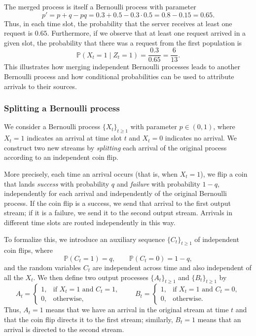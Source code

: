 The merged process is itself a Bernoulli process with parameter
\[
p' = p + q - pq = 0.3 + 0.5 - 0.3 \cdot 0.5 = 0.8 - 0.15 = 0.65.
\]
Thus, in each time slot, the probability that the server receives at least one request is \(0.65\).  
Furthermore, if we observe that at least one request arrived in a given slot, the probability that there was a request from the first population is
\[
\mathbb{P}(X_t = 1 \mid Z_t = 1)
=
\frac{0.3}{0.65}
=
\frac{6}{13}.
\]
This illustrates how merging independent Bernoulli processes leads to another Bernoulli process and how conditional probabilities can be used to attribute arrivals to their sources.


\subsubsection{Splitting a Bernoulli process}

We consider a Bernoulli process \(\{X_t\}_{t \geq 1}\) with parameter \(p \in (0,1)\), where \(X_t = 1\) indicates an arrival at time slot \(t\) and \(X_t = 0\) indicates no arrival.  
We construct two new streams by \textit{splitting} each arrival of the original process according to an independent coin flip.  

More precisely, each time an arrival occurs (that is, when \(X_t = 1\)), we flip a coin that lands \textit{success} with probability \(q\) and \textit{failure} with probability \(1-q\), independently for each arrival and independently of the original Bernoulli process.  
If the coin flip is a success, we send that arrival to the first output stream; if it is a failure, we send it to the second output stream.  
Arrivals in different time slots are routed independently in this way.  

To formalize this, we introduce an auxiliary sequence \(\{C_t\}_{t \geq 1}\) of independent coin flips, where
\[
\mathbb{P}(C_t = 1) = q,
\qquad
\mathbb{P}(C_t = 0) = 1 - q,
\]
and the random variables \(C_t\) are independent across time and also independent of all the \(X_t\).  
We then define two output processes \(\{A_t\}_{t \geq 1}\) and \(\{B_t\}_{t \geq 1}\) by
\[
A_t =
\begin{cases}
1, & \text{if } X_t = 1 \text{ and } C_t = 1,\\
0, & \text{otherwise},
\end{cases}
\qquad
B_t =
\begin{cases}
1, & \text{if } X_t = 1 \text{ and } C_t = 0,\\
0, & \text{otherwise}.
\end{cases}
\]
Thus, \(A_t = 1\) means that we have an arrival in the original stream at time \(t\) and that the coin flip directs it to the first stream; similarly, \(B_t = 1\) means that an arrival is directed to the second stream.  

